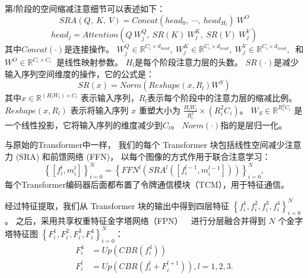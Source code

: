 第$l$阶段的空间缩减注意细节可以表述如下：
%
%
%
%
\begin{equation}
	SRA(Q,~K,~V) = Concat(head_{0},~ \cdots,~ head_{H_{l}})~W^{O}
\end{equation}
%
%
\begin{equation}
	head_{j} = Attention(Q~W_{j}^{Q}, ~ SR(K)~W_{j}^{K},~ SR(V)~W_{j}^{V})
\end{equation}
%
%
%
其中$Concat(\cdot)$是连接操作。
$W_{j}^{Q} \in \mathbb{R}^{C_{i} \times d_{head}},~
W_{j}^{K} \in \mathbb{R}^{C_{i} \times d_{head}},~
W_{j}^{V} \in \mathbb{R}^{C_{i} \times d_{head}},~$
和
$W^{O} \in \mathbb{R}^{C_{i} \times C_{i}}~$
是线性映射参数。
$H_{l}$是每个阶段注意力层的头数。
$SR(\cdot)$是减少输入序列空间维度的操作，它的公式是：
%
%
%
\begin{equation}
	SR(x) = Norm(Reshape(x, R_{l})W^{S})
\end{equation}
%
%
其中$x \in \mathbb{R}^{(H_{l}W_{l}) \times C_{l}} $
表示输入序列，$R_{l}$表示每个阶段中的注意力层的缩减比例。
$Reshape(x, R_{l})$ 表示将输入序列 $x$ 重塑大小为
$\frac{H_{l}W_{l}}{R_{i}^{2}} \times (R_{i}^{2}C_{i})$。
$W_{S} \in \mathbb{R}^{R_{i}^{2}C_{i}}$
是一个线性投影，它将输入序列的维度减少到$C_{l}$。
$Norm(\cdot)$指的是层归一化。
%
%
\par
%
%
与原始的Transformer中一样，
我们的每个 Transformer 块包括线性空间减少注意力 (SRA) 和前馈网络 (FFN)，
以每个图像的方式作用于联合注意学习：
\begin{equation}
	\left \{ [f_{i}^{l}, m_{i}^{l}]\right \}_{i=0}^{N} = \left \{ FFN^{l} \left  ( SRA^{l} \left ( [f_{i}^{l-1}, m_{i}^{l-1}]\right )\right )\right \}_{i=0}^{N},
\end{equation}
每个Transformer编码器后面都布置了令牌通信模块（TCM），用于特征通信。 
%
%
%
%
%
%
%
%
%
%
%
%
%
%
\par
经过特征提取，我们从 Transformer 块的输出中得到四层特征 
$\left \{ f_{i}^{1},f_{i}^{2},f_{i}^{3},f_{i}^{4} \right \}_{i=0}^{N}$ 。 
之后，采用共享权重特征金字塔网络（FPN）~\cite{lin2017feature}~进行分层融合并得到 $N$ 个金字塔特征图	$ \left \{F_{i}^{1},F_{i}^{2},F_{i}^{3},F_{i}^{4} \right \}_{i=0}^{N}$：
\begin{equation}
	\begin{aligned}
		F_{i}^{4} &= Up \left ( CBR \left ( f_{i}^{4} \right )\right ) \\ 
		F_{i}^{l} &= Up \left ( CBR \left ( f_{i}^{l} + F_{i}^{l+1} \right )  \right ),l=1,2,3  .
	\end{aligned}
\end{equation}
